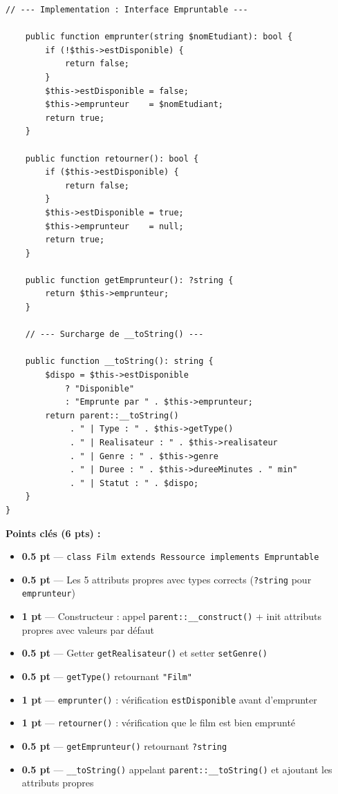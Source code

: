 \documentclass[11pt,a4paper]{article}
\begin{document}
\begin{tcolorbox}[corrbox, title={Corrigé Q3 --- Classe Film (2/2) : Empruntable + \_\_toString()}]
\begin{lstlisting}[language=PHP2]
    // --- Implementation : Interface Empruntable ---

    public function emprunter(string $nomEtudiant): bool {
        if (!$this->estDisponible) {
            return false;
        }
        $this->estDisponible = false;
        $this->emprunteur    = $nomEtudiant;
        return true;
    }

    public function retourner(): bool {
        if ($this->estDisponible) {
            return false;
        }
        $this->estDisponible = true;
        $this->emprunteur    = null;
        return true;
    }

    public function getEmprunteur(): ?string {
        return $this->emprunteur;
    }

    // --- Surcharge de __toString() ---

    public function __toString(): string {
        $dispo = $this->estDisponible
            ? "Disponible"
            : "Emprunte par " . $this->emprunteur;
        return parent::__toString()
             . " | Type : " . $this->getType()
             . " | Realisateur : " . $this->realisateur
             . " | Genre : " . $this->genre
             . " | Duree : " . $this->dureeMinutes . " min"
             . " | Statut : " . $dispo;
    }
}
\end{lstlisting}
\end{tcolorbox}

\begin{tcolorbox}[notebox]
\textbf{Points clés (6 pts) :}
\begin{itemize}[itemsep=2pt, topsep=2pt]
  \item \textbf{0.5 pt} --- \texttt{class Film extends Ressource implements Empruntable}
  \item \textbf{0.5 pt} --- Les 5 attributs propres avec types corrects (\texttt{?string} pour \texttt{emprunteur})
  \item \textbf{1 pt}   --- Constructeur : appel \texttt{parent::\_\_construct()} + init attributs propres avec valeurs par défaut
  \item \textbf{0.5 pt} --- Getter \texttt{getRealisateur()} et setter \texttt{setGenre()}
  \item \textbf{0.5 pt} --- \texttt{getType()} retournant \texttt{"Film"}
  \item \textbf{1 pt}   --- \texttt{emprunter()} : vérification \texttt{estDisponible} avant d'emprunter
  \item \textbf{1 pt}   --- \texttt{retourner()} : vérification que le film est bien emprunté
  \item \textbf{0.5 pt} --- \texttt{getEmprunteur()} retournant \texttt{?string}
  \item \textbf{0.5 pt} --- \texttt{\_\_toString()} appelant \texttt{parent::\_\_toString()} et ajoutant les attributs propres
\end{itemize}
\end{tcolorbox}
\end{document}
